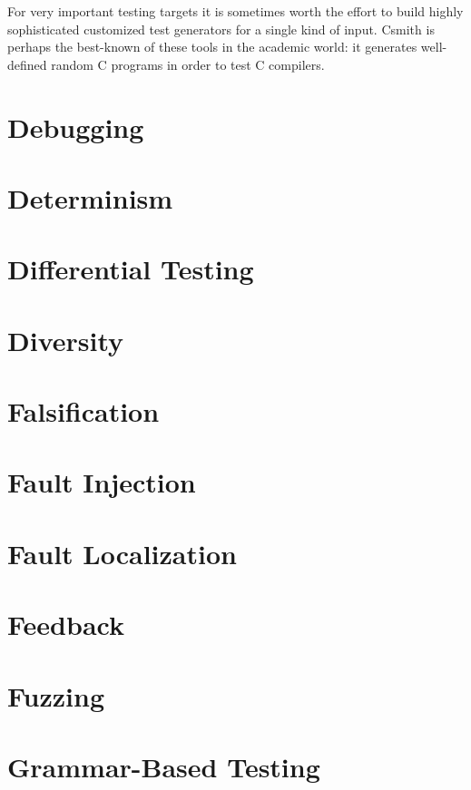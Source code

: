 For very important testing targets  it is
sometimes worth the effort to build highly sophisticated customized
test generators for a single kind of input.  Csmith \cite{csmith} is
perhaps the best-known of these tools in the academic world:  it
generates well-defined random C programs in order to test C compilers.

\chapter{Debugging}

\chapter{Determinism}

\chapter{Differential Testing}

\chapter{Diversity}

\chapter{Falsification}

\chapter{Fault Injection}

\chapter{Fault Localization}

\chapter{Feedback}

\chapter{Fuzzing}

\chapter{Grammar-Based Testing}

